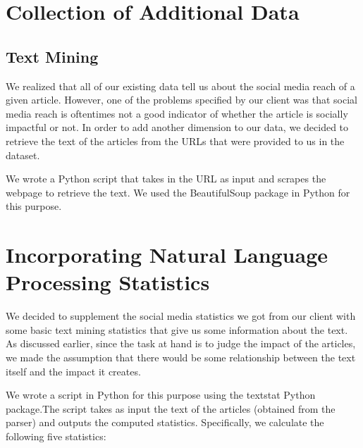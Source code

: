 \documentclass[10pt,letterpaper]{article}
\begin{document}
\section{Collection of Additional
Data}\label{collection-of-additional-data}

\subsection{Text Mining}\label{text-mining}

We realized that all of our existing data tell us about the social media
reach of a given article. However, one of the problems specified by our
client was that social media reach is oftentimes not a good indicator of
whether the article is socially impactful or not. In order to add
another dimension to our data, we decided to retrieve the text of the
articles from the URLs that were provided to us in the dataset.

We wrote a Python script that takes in the URL as input and scrapes the
webpage to retrieve the text. We used the BeautifulSoup package in
Python for this purpose.

\section{Incorporating Natural Language Processing
Statistics}\label{incorporating-natural-language-processing-statistics}

We decided to supplement the social media statistics we got from our
client with some basic text mining statistics that give us some
information about the text. As discussed earlier, since the task at hand
is to judge the impact of the articles, we made the assumption that
there would be some relationship between the text itself and the impact
it creates.

We wrote a script in Python for this purpose using the textstat Python
package.The script takes as input the text of the articles (obtained
from the parser) and outputs the computed statistics. Specifically, we
calculate the following five statistics:
\end{document}
